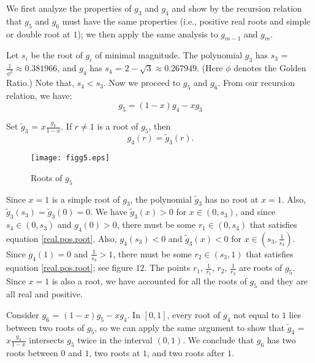 \documentclass{amsart}
\begin{document}
We first analyze the properties of $g_3$ and $g_4$ and show by the
recursion relation that $g_5$ and $g_6$ must have the same
properties
(i.e., positive real roots and simple or double root at $1$); 
we then apply the same analysis to $g_{m-1}$ and $g_m$.

Let $s_i$ be the root of $g_i$ of minimal magnitude. The polynomial
$g_3$ has $s_3$ = $\frac{1}{\phi^2} \approx 0.381966$, and $g_4$ has
$s_4$ = $2-\sqrt 3 \approx 0.267949$.  (Here $\phi$ denotes the 
Golden Ratio.)
Note that, $s_4 < s_3$. Now
we proceed to $g_5$ and $g_6$. From our recursion relation, we have;
\begin{equation*}
g_5 = (1-x)g_4 -xg_3
\end{equation*}

Set $\tilde g_3$ = $x\frac{g_3}{1-x}$.  If $r \ne 1$ is a root of
$g_5$, then
\begin{equation}\label{real.pos.root}
g_4(r) = \tilde g_3 (r).
\end{equation}

\begin{figure}[ht]
\begin{center}
\texttt{[image: figg5.eps]}
\caption{Roots of $g_5$} \label{figg5}
\end{center}
\end{figure}

Since $x=1$ is a simple root of $g_3$, the polynomial $\tilde g_3$
has no root at $x=1$.  Also, $\tilde g_3(s_3) = \tilde g_3(0) = 0$.
We have $\tilde g_3(x)>0$ for $x \in (0, s_3)$, and since $s_4 \in
(0,s_3)$ and $g_4(0) > 0$, there must be some $r_1 \in (0,s_4)$ that
satisfies equation \eqref{real.pos.root}.  Also, $g_4(s_3) < 0 $ and
$\tilde g_3(x) < 0$ for $x \in (s_3, \frac{1}{s_3})$. Since $g_4(1) = 0$
and $\frac{1}{s_3} > 1$, there must be some $r_2 \in (s_3, 1)$
that satisfies equation \eqref{real.pos.root}; see figure $12$. The
points $r_1$, $\frac{1}{r_1}$, $r_2$, $\frac{1}{r_2}$ are roots of
$g_5$. Since $x=1$ is also a root, we have accounted for all the
roots of $g_5$ and they are all real and positive.

Consider $g_6$ = $(1-x)g_5 - xg_4$.  In $[0,1]$, every root of $g_4$
not equal to $1$ lies between two roots of $g_5$, so we can apply
the same argument to show that $\tilde g_4 $ = $x \frac{g_4}{1-x}$
intersects $g_5$ twice in the interval $(0,1)$. We conclude that
$g_6$ has two roots between $0$ and $1$, two roots at $1$, and two
roots after $1$.
\end{document}
